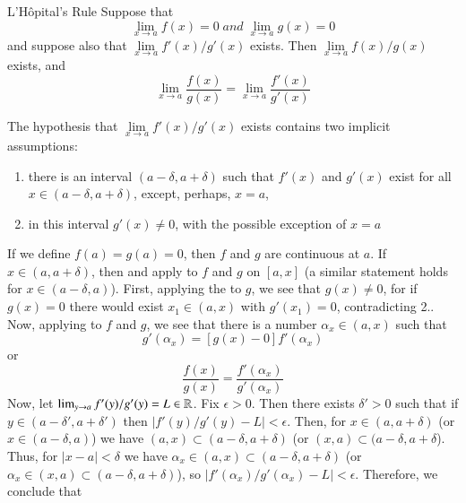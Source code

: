 \documentclass[12pt]{report}
\begin{document}
\begin{namthm}{L'H\^{o}pital's Rule}{}
    Suppose that \begin{equation}
        \lim\limits_{x\rightarrow a}f(x) = 0\;and\;\lim\limits_{x\rightarrow a}g(x) = 0
    \end{equation}
    and suppose also that $\lim\limits_{x\rightarrow a}f'(x)/g'(x)$ exists. Then $\lim\limits_{x\rightarrow a}f(x)/g(x)$ exists, and \begin{equation}
        \lim\limits_{x\rightarrow a}\frac{f(x)}{g(x)} = \lim\limits_{x\rightarrow a}\frac{f'(x)}{g'(x)}
    \end{equation}
\end{namthm}
\begin{proof*}{}{}
    The hypothesis that $\lim\limits_{x\rightarrow a}f'(x)/g'(x)$ exists contains two implicit assumptions: \begin{enumerate}
        \item there is an interval $(a-\delta,a+\delta)$ such that $f'(x)$ and $g'(x)$ exist for all $x \in (a - \delta, a + \delta)$, except, perhaps, $x = a$,
        \item in this interval $g'(x) \neq 0$, with the possible exception of $x = a$
    \end{enumerate}
    If we define $f(a) = g(a) = 0$, then $f$ and $g$ are continuous at $a$. If $x \in (a,a+\delta)$, then  and  apply to $f$ and $g$ on $[a,x]$ (a similar statement holds for $x \in (a-\delta, a)$). First, applying the  to $g$, we see that $g(x) \neq 0$, for if $g(x) = 0$ there would exist $x_1 \in (a,x)$ with $g'(x_1) = 0$, contradicting 2.. Now, applying  to $f$ and $g$, we see that there is a number $\alpha_x \in (a,x)$ such that \begin{equation*}
        [f(x)-0]g'(\alpha_x) = [g(x)-0]f'(\alpha_x)
    \end{equation*}
    or \begin{equation*}
        \frac{f(x)}{g(x)} = \frac{f'(\alpha_x)}{g'(\alpha_x)}
    \end{equation*}
    Now, let $\lim_{y\rightarrow a}f'(y)/g'(y) = L \in \mathbb R$. Fix $\epsilon > 0$. Then there exists $\delta' > 0$ such that if $y \in (a - \delta', a + \delta')$ then $|f'(y)/g'(y) - L| < \epsilon$. Then, for $x \in (a,a+\delta)$ (or $x \in (a-\delta, a)$) we have $(a,x) \subset (a-\delta, a+\delta)$ (or $(x,a) \subset (a-\delta, a+\delta$). Thus, for $|x-a| < \delta$ we have $\alpha_x \in (a,x) \subset (a -\delta, a+\delta)$ (or $\alpha_x \in (x,a) \subset (a-\delta,a+\delta)$), so $|f'(\alpha_x)/g'(\alpha_x) - L| < \epsilon$. Therefore, we conclude that \begin{equation*}

\end{equation*}
\end{proof*}
\end{document}
